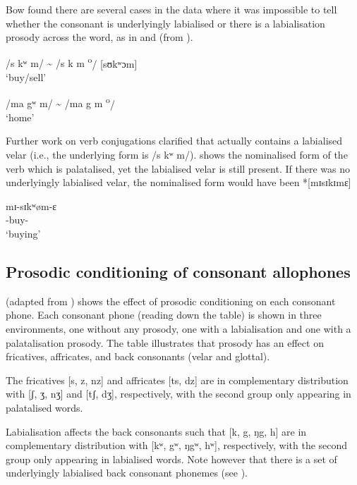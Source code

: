 \largerpage
Bow found there are several cases in the data where it was impossible to tell whether the consonant is underlyingly labialised or there is a labialisation prosody across the word, as in  and  (from \citealt{Bow1997c}).

\ea \label{ex:2:26}
\textup{/s kʷ m/ {\textasciitilde} /s k m \textsuperscript{o}}\textup{/   \ExampleSpace \hspace{15pt}    [sʊkʷɔm]}\\
\glt  ‘buy/sell’      
\z

\largerpage
\ea \label{ex:2:27}
\textup{/ma gʷ m/ {\textasciitilde}  /ma g m \textsuperscript{o}}\textup{/  \ExampleSpace [mɔgʷɔm]}\\
\glt  ‘home’
\z

Further work on verb conjugations clarified that  actually contains a labialised velar (i.e., the underlying form is /s kʷ m/).  shows the nominalised form of the verb which is palatalised, yet the labialised velar is still present. If there was no underlyingly labialised velar, the nominalised form would have been *[mɪsɪkɪmɛ]

\ea \label{ex:2:28}
mɪ-sɪkʷøm-ɛ\\
      {\NOM}{}-buy-{\CL}\\
\glt  ‘buying’
\z

\subsection{Prosodic conditioning of consonant allophones}\label{sec:2.2.3}
\hypertarget{RefHeading1210501525720847}{}
 (adapted from \citealt{Bow1997c}) shows the effect of prosodic conditioning on each consonant phone.  Each consonant phone (reading down the table) is shown in three environments, one without any prosody, one with a labialisation and one with a palatalisation prosody. The table illustrates that prosody has an effect on fricatives, affricates, and back consonants (velar and glottal).

The fricatives [s, z, nz] and affricates [ts, dz] are in complementary distribution with [ʃ, ʒ, nʒ] and [tʃ, dʒ], respectively, with the second group only appearing in palatalised words.  

Labialisation affects the back consonants such that [k, g, ŋg, h] are in complementary distribution with [kʷ, gʷ, ŋgʷ, hʷ], respectively, with the second group only appearing in labialised words. Note however that there is a set of underlyingly labialised back consonant phonemes (see ).

